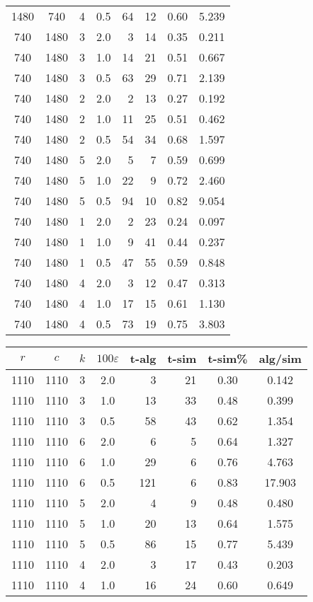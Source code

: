 \documentclass[11pt]{svjour3} \usepackage{fullpage}
\newcommand{\eps}{\varepsilon}
\begin{document}
{\begin{tabular}[t]{@{}|c@{~~}c@{~~}c@{~}c@{~}r@{~}r@{~}c@{~}c|}
\\ 1480 & 740 & 4 & 0.5 & 64 & 12 & 0.60 & 5.239
\\ 740 & 1480 & 3 & 2.0 & 3 & 14 & 0.35 & 0.211
\\ 740 & 1480 & 3 & 1.0 & 14 & 21 & 0.51 & 0.667
\\ 740 & 1480 & 3 & 0.5 & 63 & 29 & 0.71 & 2.139
\\ 740 & 1480 & 2 & 2.0 & 2 & 13 & 0.27 & 0.192
\\ 740 & 1480 & 2 & 1.0 & 11 & 25 & 0.51 & 0.462
\\ 740 & 1480 & 2 & 0.5 & 54 & 34 & 0.68 & 1.597
\\ 740 & 1480 & 5 & 2.0 & 5 & 7 & 0.59 & 0.699
\\ 740 & 1480 & 5 & 1.0 & 22 & 9 & 0.72 & 2.460
\\ 740 & 1480 & 5 & 0.5 & 94 & 10 & 0.82 & 9.054
\\ 740 & 1480 & 1 & 2.0 & 2 & 23 & 0.24 & 0.097
\\ 740 & 1480 & 1 & 1.0 & 9 & 41 & 0.44 & 0.237
\\ 740 & 1480 & 1 & 0.5 & 47 & 55 & 0.59 & 0.848
\\ 740 & 1480 & 4 & 2.0 & 3 & 12 & 0.47 & 0.313
\\ 740 & 1480 & 4 & 1.0 & 17 & 15 & 0.61 & 1.130
\\ 740 & 1480 & 4 & 0.5 & 73 & 19 & 0.75 & 3.803
\\ \hline
\end{tabular}
\begin{tabular}[t]{@{}|c@{~~}c@{~~}c@{~}c@{~}r@{~}r@{~}c@{~}c|} \hline
$r$	& $c$	& $k$	& $100\eps$	& t-alg	& t-sim	& t-sim\% & alg/sim \\ \hline
 1110 & 1110 & 3 & 2.0 & 3 & 21 & 0.30 & 0.142
\\ 1110 & 1110 & 3 & 1.0 & 13 & 33 & 0.48 & 0.399
\\ 1110 & 1110 & 3 & 0.5 & 58 & 43 & 0.62 & 1.354
\\ 1110 & 1110 & 6 & 2.0 & 6 & 5 & 0.64 & 1.327
\\ 1110 & 1110 & 6 & 1.0 & 29 & 6 & 0.76 & 4.763
\\ 1110 & 1110 & 6 & 0.5 & 121 & 6 & 0.83 & 17.903
\\ 1110 & 1110 & 5 & 2.0 & 4 & 9 & 0.48 & 0.480
\\ 1110 & 1110 & 5 & 1.0 & 20 & 13 & 0.64 & 1.575
\\ 1110 & 1110 & 5 & 0.5 & 86 & 15 & 0.77 & 5.439
\\ 1110 & 1110 & 4 & 2.0 & 3 & 17 & 0.43 & 0.203
\\ 1110 & 1110 & 4 & 1.0 & 16 & 24 & 0.60 & 0.649

\end{tabular}}
\end{document}
